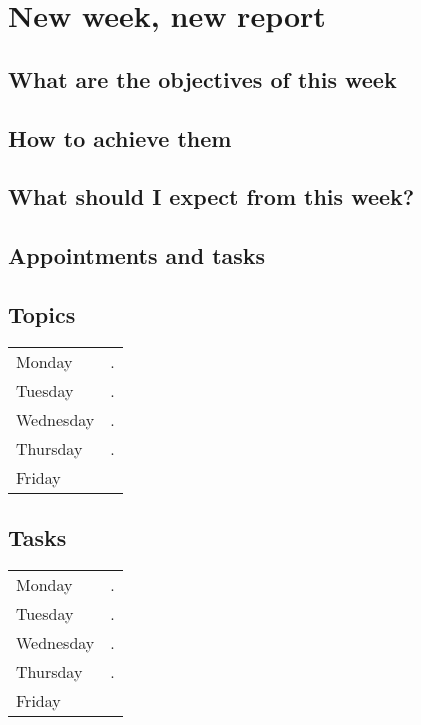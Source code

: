 
\section*{\textbf{New week, new report}}
\subsection*{What are the objectives of this week}
\subsection*{How to achieve them}
\subsection*{What should I expect from this week?}
\subsection*{Appointments and tasks}
\subsection*{Topics}
	\begin{center}                                                          
	\begin{tabular}{l|p{}} %
	Monday & . \\                                                 
	Tuesday & .\\                                                        
	Wednesday & .\\                                       
	Thursday & . \\       	
	Friday
	\end{tabular}                                                           
        \end{center} 
\subsection*{Tasks}
	\begin{center}                                                          
	\begin{tabular}{l|p{}} %
	Monday & . \\                                                 
	Tuesday & .\\                                                        
	Wednesday & .\\                                       
	Thursday & . \\       	
	Friday
	\end{tabular}                                                           
        \end{center} 
